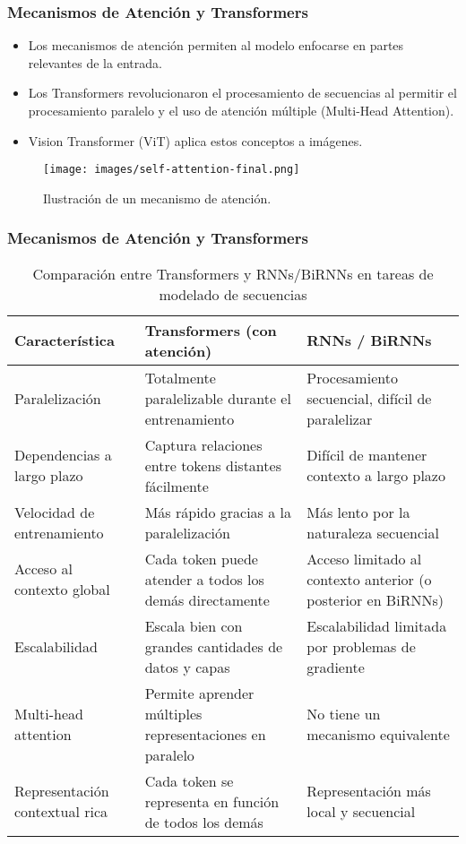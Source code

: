 \begin{frame}
\frametitle{Mecanismos de Atención y Transformers}
\begin{itemize}
    \item Los mecanismos de atención permiten al modelo enfocarse en partes relevantes de la entrada.
    \item Los Transformers revolucionaron el procesamiento de secuencias al permitir el procesamiento paralelo y el uso de atención múltiple (Multi-Head Attention).
    \item Vision Transformer (ViT) aplica estos conceptos a imágenes.
\end{itemize}
\begin{figure}[ht!]
    \centering
    \texttt{[image: images/self-attention-final.png]}
    \caption{Ilustración de un mecanismo de atención.}
\end{figure}
\end{frame}

\begin{frame}
\frametitle{Mecanismos de Atención y Transformers}
\begin{table}[h!]
    \centering
    \fontsize{7}{8}\selectfont
    \begin{tabular}{|p{2.5cm}|p{3cm}|p{3cm}|}
        \hline
        \textbf{Característica} & \textbf{Transformers (con atención)} & \textbf{RNNs / BiRNNs} \\
        \hline
        Paralelización & Totalmente paralelizable durante el entrenamiento & Procesamiento secuencial, difícil de paralelizar \\
        \hline
        Dependencias a largo plazo & Captura relaciones entre tokens distantes fácilmente & Difícil de mantener contexto a largo plazo \\
        \hline
        Velocidad de entrenamiento & Más rápido gracias a la paralelización & Más lento por la naturaleza secuencial \\
        \hline
        Acceso al contexto global & Cada token puede atender a todos los demás directamente & Acceso limitado al contexto anterior (o posterior en BiRNNs) \\
        \hline
        Escalabilidad & Escala bien con grandes cantidades de datos y capas & Escalabilidad limitada por problemas de gradiente \\
        \hline
        Multi-head attention & Permite aprender múltiples representaciones en paralelo & No tiene un mecanismo equivalente \\
        \hline
        Representación contextual rica & Cada token se representa en función de todos los demás & Representación más local y secuencial \\
        \hline
    \end{tabular}
    \caption{Comparación entre Transformers y RNNs/BiRNNs en tareas de modelado de secuencias}
    \label{tab:comparacion_transformers_rnns}
\end{table}    
\end{frame}

